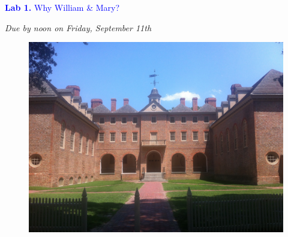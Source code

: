 \documentclass{article}
\begin{document}
\vspace*{.01mm}

\begin{center}

\Large{\textcolor{blue}{\textbf{Lab 1.}  Why William \& Mary?}}

\vspace{4mm}

\textit{Due by noon on Friday, September 11th}\\

\end{center}

\begin{figure}[h!]
\begin{center}
\includegraphics[width=1.0\textwidth]{wm_wrenbldg.jpg}

\end{center}
\end{figure}

\setlength{\parindent}{0cm}
\end{document}
